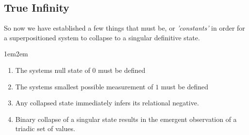 \documentclass[11pt]{article}
\newenvironment{customenumerate}[1][]
{
    \begin{adjustwidth}{1em}{2em}
    \begin{enumerate}[#1]
}
{
    \end{enumerate}
    \end{adjustwidth}
}
\begin{document}
    \subsection{True Infinity}
        So now we have established a few things that must be, or \emph{'constants'} in order for a superpositioned system to collapse to a singular definitive state.
        \begin{customenumerate}[label=\roman*.]
            \item The systems null state of $0$ must be defined
            \item The systems smallest possible measurement of $1$ must be defined
            \item Any collapsed state immediately infers its relational negative.
            \item Binary collapse of a singular state results in the emergent observation of a triadic set of values.
        \end{customenumerate}
\end{document}
